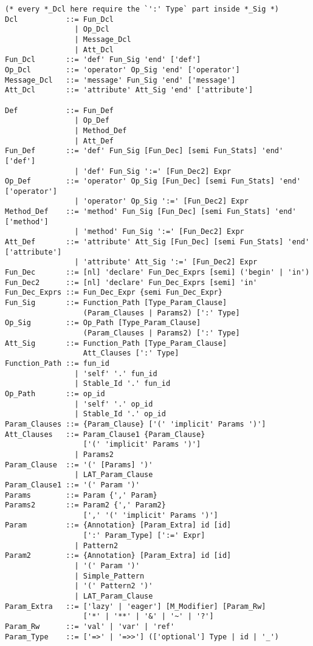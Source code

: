 \syntax\begin{lstlisting}
(* every *_Dcl here require the `':' Type` part inside *_Sig *)
Dcl           ::= Fun_Dcl
                | Op_Dcl
                | Message_Dcl 
                | Att_Dcl
Fun_Dcl       ::= 'def' Fun_Sig 'end' ['def']
Op_Dcl        ::= 'operator' Op_Sig 'end' ['operator']
Message_Dcl   ::= 'message' Fun_Sig 'end' ['message']
Att_Dcl       ::= 'attribute' Att_Sig 'end' ['attribute']

Def           ::= Fun_Def
                | Op_Def
                | Method_Def
                | Att_Def
Fun_Def       ::= 'def' Fun_Sig [Fun_Dec] [semi Fun_Stats] 'end' ['def']
                | 'def' Fun_Sig ':=' [Fun_Dec2] Expr
Op_Def        ::= 'operator' Op_Sig [Fun_Dec] [semi Fun_Stats] 'end' ['operator']
                | 'operator' Op_Sig ':=' [Fun_Dec2] Expr
Method_Def    ::= 'method' Fun_Sig [Fun_Dec] [semi Fun_Stats] 'end' ['method']
                | 'method' Fun_Sig ':=' [Fun_Dec2] Expr
Att_Def       ::= 'attribute' Att_Sig [Fun_Dec] [semi Fun_Stats] 'end' ['attribute']
                | 'attribute' Att_Sig ':=' [Fun_Dec2] Expr
Fun_Dec       ::= [nl] 'declare' Fun_Dec_Exprs [semi] ('begin' | 'in')
Fun_Dec2      ::= [nl] 'declare' Fun_Dec_Exprs [semi] 'in'
Fun_Dec_Exprs ::= Fun_Dec_Expr {semi Fun_Dec_Expr}
Fun_Sig       ::= Function_Path [Type_Param_Clause] 
                  (Param_Clauses | Params2) [':' Type]
Op_Sig        ::= Op_Path [Type_Param_Clause] 
                  (Param_Clauses | Params2) [':' Type]
Att_Sig       ::= Function_Path [Type_Param_Clause] 
                  Att_Clauses [':' Type]
Function_Path ::= fun_id
                | 'self' '.' fun_id
                | Stable_Id '.' fun_id
Op_Path       ::= op_id
                | 'self' '.' op_id
                | Stable_Id '.' op_id
Param_Clauses ::= {Param_Clause} ['(' 'implicit' Params ')']
Att_Clauses   ::= Param_Clause1 {Param_Clause} 
                  ['(' 'implicit' Params ')']
                | Params2
Param_Clause  ::= '(' [Params] ')'
                | LAT_Param_Clause
Param_Clause1 ::= '(' Param ')'
Params        ::= Param {',' Param}
Params2       ::= Param2 {',' Param2}
                  [',' '(' 'implicit' Params ')']
Param         ::= {Annotation} [Param_Extra] id [id]
                  [':' Param_Type] [':=' Expr]
                | Pattern2
Param2        ::= {Annotation} [Param_Extra] id [id]
                | '(' Param ')'
                | Simple_Pattern
                | '(' Pattern2 ')'
                | LAT_Param_Clause
Param_Extra   ::= ['lazy' | 'eager'] [M_Modifier] [Param_Rw] 
                  ['*' | '**' | '&' | '~' | '?']
Param_Rw      ::= 'val' | 'var' | 'ref'
Param_Type    ::= ['=>' | '=>>'] (['optional'] Type | id | '_')
\end{lstlisting}

